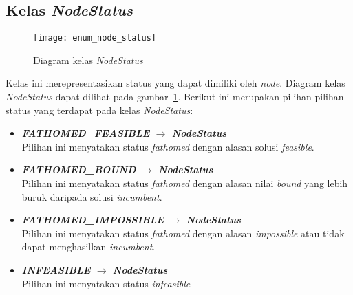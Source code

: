 \subsection{Kelas \textit{NodeStatus}}
\begin{figure}[H]
	\centering  
	\texttt{[image: enum\_node\_status]}
	\caption[Diagram kelas \textit{NodeStatus}]{Diagram kelas \textit{NodeStatus}}
	\label{fig:enum_node_status}
\end{figure}
Kelas ini merepresentasikan status yang dapat dimiliki oleh \textit{node}. Diagram kelas \textit{NodeStatus} dapat dilihat pada gambar~\ref{fig:enum_node_status}. Berikut ini merupakan pilihan-pilihan status yang terdapat pada kelas \textit{NodeStatus}:
\begin{itemize}
	\item \textbf{\textit{FATHOMED\_FEASIBLE} $\rightarrow$ \textit{NodeStatus}}\\
	Pilihan ini menyatakan status \textit{fathomed} dengan alasan solusi \textit{feasible}.
	\item \textbf{\textit{FATHOMED\_BOUND} $\rightarrow$ \textit{NodeStatus}}\\
	Pilihan ini menyatakan status \textit{fathomed} dengan alasan nilai \textit{bound} yang lebih buruk daripada solusi \textit{incumbent}.
	\item \textbf{\textit{FATHOMED\_IMPOSSIBLE} $\rightarrow$ \textit{NodeStatus}}\\
	Pilihan ini menyatakan status \textit{fathomed} dengan alasan \textit{impossible} atau tidak dapat menghasilkan \textit{incumbent}.
	\item \textbf{\textit{INFEASIBLE} $\rightarrow$ \textit{NodeStatus}}\\
	Pilihan ini menyatakan status \textit{infeasible}
\end{itemize}

